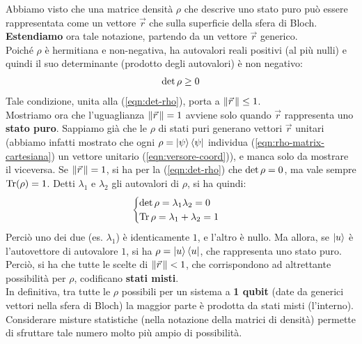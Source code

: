 \documentclass[../../InformazioneQuantistica.tex]{subfiles}
\begin{document}
Abbiamo visto che una matrice densità $\rho$ che descrive uno stato puro può essere rappresentata come un vettore $\vec{r}$ che  sulla superficie della sfera di Bloch.\\

 \textbf{Estendiamo} ora tale notazione, partendo da un vettore $\vec{r}$ generico.\\
Poiché $\rho$ è hermitiana e non-negativa, ha autovalori reali positivi (al più nulli) e quindi il suo determinante (prodotto degli autovalori) è non negativo:
\begin{align*}
\operatorname{det}\rho \geq 0
\end{align*}
Tale condizione, unita alla (\ref{eqn:det-rho}), porta a $\left\lVert\vec{r}\,\right\rVert\leq 1$.\\

Mostriamo ora che l'uguaglianza $\left\lVert\vec{r}\,\right\rVert=1$ avviene solo quando $\vec{r}$ rappresenta uno \textbf{stato puro}. Sappiamo già che le $\rho$ di stati puri generano vettori $\vec{r}$ unitari (abbiamo infatti mostrato che ogni $\rho=\Ket{\psi}\Bra{\psi}$ individua (\ref{eqn:rho-matrix-cartesiana}) un vettore unitario (\ref{eqn:versore-coord})), e manca solo da mostrare il viceversa. Se $\left\lVert\vec{r}\,\right\rVert=1$, si ha per la (\ref{eqn:det-rho}) che $\operatorname{det}\rho = 0$, ma vale sempre $\operatorname{Tr}(\rho)=1$. Detti $\lambda_1$ e $\lambda_2$ gli autovalori di $\rho$, si ha quindi:
\begin{align*}
\begin{cases}
\operatorname{det}\rho = \lambda_1\lambda_2 = 0\\
\operatorname{Tr} \rho = \lambda_1 + \lambda_2 = 1
\end{cases}
\end{align*}
Perciò uno dei due (es. $\lambda_1$) è identicamente $1$, e l'altro è nullo. Ma allora, se $\Ket{u}$ è l'autovettore di autovalore $1$, si ha $\rho = \Ket{u}\Bra{u}$, che rappresenta uno stato puro.\\

Perciò, si ha che tutte le scelte di $\left\lVert\vec{r}\,\right\rVert<1$, che corrispondono ad altrettante possibilità per $\rho$, codificano \textbf{stati misti}.\\
In definitiva, tra tutte le $\rho$ possibili per un sistema a \textbf{1 qubit} (date da generici vettori nella sfera di Bloch) la maggior parte è prodotta da stati misti (l'interno). Considerare misture statistiche (nella notazione della matrici di densità) permette di sfruttare tale numero molto più ampio di possibilità.\\
\end{document}

